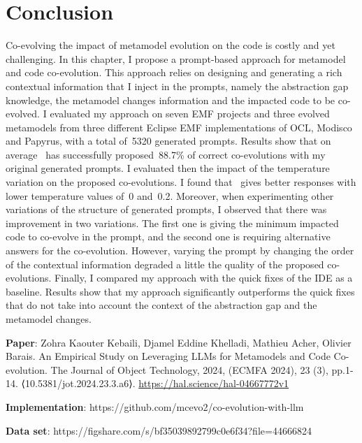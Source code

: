 \section{Conclusion}
\label{ch3_conclu}
Co-evolving the impact of metamodel evolution on the code is costly and yet challenging. In this chapter, I propose a prompt-based approach for metamodel and code co-evolution. This approach relies on designing and generating a rich contextual information that I inject in the prompts, namely the abstraction gap knowledge, the metamodel changes information and  the impacted code to be co-evolved.
I evaluated my approach on seven EMF projects and three evolved metamodels from three different Eclipse EMF implementations of OCL, Modisco and Papyrus, with a total of~5320 generated prompts. Results show that on average \LLM~has successfully proposed~88.7\% of correct co-evolutions with my original generated prompts. I evaluated then the impact of the temperature variation on the proposed co-evolutions. I found that \LLM~gives better responses with lower temperature values of~0 and~0.2. 
Moreover, when experimenting other variations of the structure of generated prompts, I observed that there was improvement in two variations. 
The first one is giving the minimum impacted code to co-evolve in the prompt, and the second one is requiring alternative answers for the co-evolution. However, varying the prompt by changing the order of the contextual information degraded a little the quality of the proposed co-evolutions. 
Finally, I compared my approach with the quick fixes of the IDE as a baseline. Results show that my approach significantly outperforms the quick fixes that do not take into account the context of the abstraction gap and the metamodel changes.
\begin{myexamplec}
	\small
	\textbf{Paper}: Zohra Kaouter Kebaili, Djamel Eddine Khelladi, Mathieu Acher, Olivier Barais. An Empirical Study on Leveraging LLMs for Metamodels and Code Co-evolution. The Journal of Object Technology, 2024, (ECMFA 2024), 23 (3), pp.1-14. ⟨10.5381/jot.2024.23.3.a6⟩. %
	\url{https://hal.science/hal-04667772v1}
	
	\textbf{Implementation}: https://github.com/mcevo2/co-evolution-with-llm
	
	\textbf{Data set}: https://figshare.com/s/bf35039892799c0e6f34?file=44666824
\end{myexamplec}
